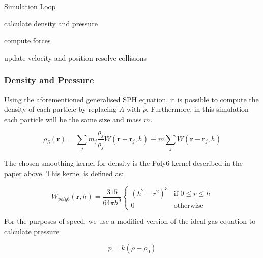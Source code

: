 \documentclass[a4paper, 12pt]{article}
\begin{document}
    \begin{algorithm}
        \caption{Simulation Loop}

        \begin{algorithmic}[1]
                \State calculate density and pressure
            \EndFor

                \State compute forces
            \EndFor

                \State update velocity and position
                \State resolve collisions
            \EndFor
        \end{algorithmic}

    \end{algorithm}

    \subsubsection{Density and Pressure}

    Using the aforementioned generalised SPH equation, it is possible to compute the density of each particle by replacing $A$ with $\rho$. Furthermore, in this simulation each particle will be the same size and mass $m$.

    \begin{equation}
        \rho_S(\textbf{r}) = \sum_{j}{m_j \frac{\rho_j}{\rho_j}W(\textbf{r} - \textbf{r}_j, h)} \equiv m\sum_{j}{W(\textbf{r} - \textbf{r}_j, h)}
    \end{equation}

    The chosen smoothing kernel for density is the Poly6 kernel described in the paper above\cite{sca}. This kernel is defined as:

    \begin{equation}
        W_{poly6}(\textbf{r}, h) = \frac{315}{64\pi{h}^9}
        \begin{cases}
            (h^2 - r^2)^3 & \text{if } 0 \leq r \leq h \\
            0 & \text{otherwise}
        \end{cases}
    \end{equation}

    For the purposes of speed, we use a modified version of the ideal gas equation to calculate pressure

    \begin{equation}
        p = k(\rho - \rho_0)
    \end{equation}
\end{document}
